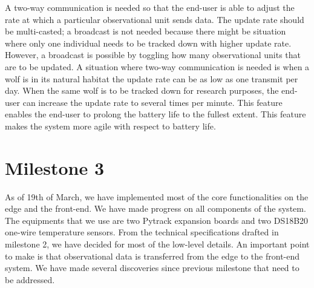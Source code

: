 		A two-way communication is needed so that the end-user is able to adjust the rate at which a particular observational unit sends data. The update rate should be multi-casted; a broadcast is not needed because there might be situation where only one individual needs to be tracked down with higher update rate. However, a broadcast is possible by toggling how many observational units that are to be updated. A situation where two-way communication is needed is  when a wolf is in its natural habitat the update rate can be as low as one transmit per day. When the same wolf is to be tracked down for research purposes, the end-user can increase the update rate to several times per minute. This feature enables the end-user to prolong the battery life to the fullest extent. This feature makes the system more agile with respect to battery life. 

\section{Milestone 3}
	As of 19th of March, we have implemented most of the core functionalities on the edge and the front-end. We have made progress on all components of the system. The equipments that we use are two Pytrack expansion boards and two DS18B20 one-wire temperature sensors. From the technical specifications drafted in milestone 2, we have decided for most of the low-level details. An important point to make is that observational data is transferred from the edge to the front-end system. We have made several discoveries since previous milestone that need to be addressed.
 

